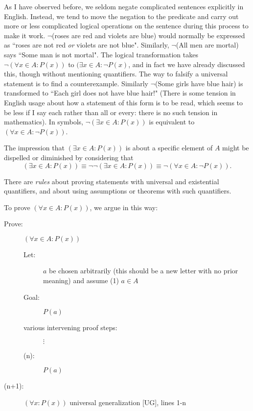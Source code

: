 \documentclass[12pt]{article}
\begin{document}
As I have observed before, we seldom negate complicated sentences explicitly in English.  Instead, we tend to move the negation to the predicate and carry out more or less complicated logical operations on the sentence during this process to make it work.  $\neg$(roses are red and violets are blue) would normally be expressed as ``roses are not red {\em or\/} violets are not blue".  Similarly, $\neg$(All men are mortal) says
``Some man is not mortal".  The logical transformation takes $\neg(\forall x\in A:P(x))$ to $(\exists x \in A:\neg P(x)$, and in fact we have already discussed this, though without mentioning quantifiers.  The way to falsify a universal statement is to find a counterexample.   Similarly
$\neg$(Some girls have blue hair) is transformed to ``Each girl does not have blue hair!" (There is some tension in English usage about how a statement of this form is to be read, which seems to be less if I say each rather than all or every:  there is no such tension in mathematics).  In symbols, $\neg(\exists x \in A:P(x))$ is equivalent to $(\forall x \in A:\neg P(x))$.

The impression that $(\exists x \in A:P(x))$ is about a specific element of $A$ might be dispelled or diminished by considering that
$$(\exists x \in A:P(x)) \equiv \neg\neg (\exists x \in A:P(x)) \equiv \neg(\forall x\in A : \neg P(x)).$$

There are {\em rules\/} about proving statements with universal and existential quantifiers, and about using assumptions or theorems with such quantifiers.

To prove $(\forall x \in A:P(x))$, we argue in this way:

\begin{description}
\item[Prove:]  $(\forall x \in A:P(x))$

\begin{description}

\item[Let:]  $a$ be chosen arbitrarily (this should be a new letter with no prior meaning) and assume (1) $a \in A$
\item[Goal:]  $P(a)$

\item[various intervening proof steps:] $\vdots$

\item[(n):]  $P(a)$

\end{description}

\item[(n+1):]  $(\forall x:P(x))$ universal generalization [UG], lines 1-n

\end{description}
\end{document}
